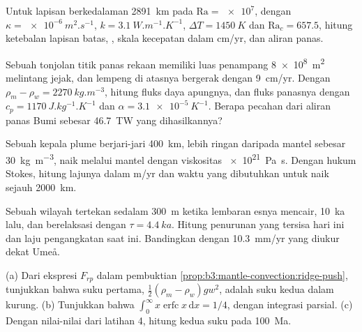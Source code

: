 \begin{exercise}[$\star\star$]\label{exo:b3:mantle-convection:6}
Untuk lapisan berkedalaman \qty{2891}{km} pada $\mathrm{Ra} = \num{e7}$, dengan $\kappa =
\qty{e-6}{m^2.s^{-1}}$, $k = \qty{3.1}{W.m^{-1}.K^{-1}}$, $\Delta T =
\qty{1450}{K}$ dan $\mathrm{Ra}_c = 657.5$, hitung ketebalan
lapisan batas, , skala kecepatan dalam \unit{cm/yr}, dan
aliran panas.
\end{exercise}

\begin{exercise}[$\star\star$]\label{exo:b3:mantle-convection:7}
Sebuah tonjolan titik panas rekaan memiliki luas penampang \qty{8e8}{m^2} melintang
jejak, dan lempeng di atasnya bergerak dengan \qty{9}{cm/yr}. Dengan $\rho_m - \rho_w =
\qty{2270}{kg.m^{-3}}$, hitung fluks daya apungnya, dan fluks panasnya dengan $c_p =
\qty{1170}{J.kg^{-1}.K^{-1}}$ dan $\alpha = \qty{3.1e-5}{K^{-1}}$. Berapa pecahan
dari aliran panas Bumi sebesar \qty{46.7}{TW} yang dihasilkannya?
\end{exercise}

\begin{exercise}[$\star\star$]\label{exo:b3:mantle-convection:8}
Sebuah kepala plume berjari-jari \qty{400}{km}, lebih ringan daripada mantel sebesar
\qty{30}{kg.m^{-3}}, naik melalui mantel dengan viskositas \qty{e21}{Pa.s}. Dengan
hukum Stokes, hitung lajunya dalam \unit{m/yr} dan waktu yang dibutuhkan untuk naik sejauh
\qty{2000}{km}.
\end{exercise}

\begin{exercise}[$\star\star$]\label{exo:b3:mantle-convection:9}
Sebuah wilayah tertekan sedalam \qty{300}{m} ketika lembaran esnya mencair, \qty{10}{ka} lalu,
dan berelaksasi dengan $\tau = \qty{4.4}{ka}$. Hitung penurunan yang tersisa hari ini dan
laju pengangkatan saat ini. Bandingkan dengan \qty{10.3}{mm/yr} yang diukur dekat
Umeå.
\end{exercise}

\begin{exercise}[$\star\star\star$]\label{exo:b3:mantle-convection:10}
(a) Dari ekspresi $F_{rp}$ dalam pembuktian
\cref{prop:b3:mantle-convection:ridge-push}, tunjukkan bahwa suku pertama,
$\tfrac12(\rho_m - \rho_w)gw^2$, adalah suku kedua dalam kurung. (b) Tunjukkan bahwa
$\int_0^\infty x\operatorname{erfc}x\,\mathrm dx = 1/4$, dengan integrasi parsial.
(c) Dengan nilai-nilai dari latihan 4, hitung kedua suku pada \qty{100}{Ma}.
\end{exercise}

